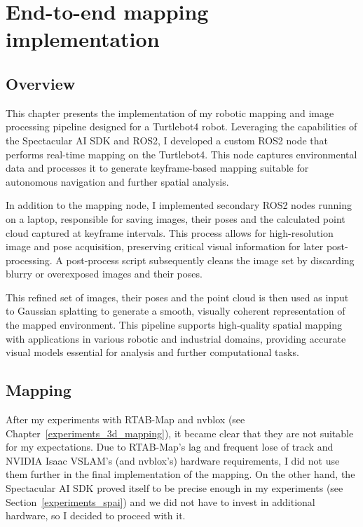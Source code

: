 \chapter{End-to-end mapping implementation} \label{implementation}


\section{Overview}

This chapter presents the implementation of my robotic mapping and image processing pipeline designed for a Turtlebot4 robot. Leveraging the capabilities of the Spectacular AI SDK and ROS2, I developed a custom ROS2 node that performs real-time mapping on the Turtlebot4. This node captures environmental data and processes it to generate keyframe-based mapping suitable for autonomous navigation and further spatial analysis.

In addition to the mapping node, I implemented secondary ROS2 nodes running on a laptop, responsible for saving images, their poses and the calculated point cloud captured at keyframe intervals. This process allows for high-resolution image and pose acquisition, preserving critical visual information for later post-processing. A post-process script subsequently cleans the image set by discarding blurry or overexposed images and their poses. 

This refined set of images, their poses and the point cloud is then used as input to Gaussian splatting to generate a smooth, visually coherent representation of the mapped environment. This pipeline supports high-quality spatial mapping with applications in various robotic and industrial domains, providing accurate visual models essential for analysis and further computational tasks.

\section{Mapping}

After my experiments with RTAB-Map and nvblox (see Chapter~\ref{experiments_3d_mapping}), it became clear that they are not suitable for my expectations. Due to RTAB-Map's lag and frequent lose of track and NVIDIA Isaac VSLAM's (and nvblox's) hardware requirements, I did not use them further in the final implementation of the mapping. On the other hand, the Spectacular AI SDK proved itself to be precise enough in my experiments (see Section~\ref{experiments_spai}) and we did not have to invest in additional hardware, so I decided to proceed with it. 

